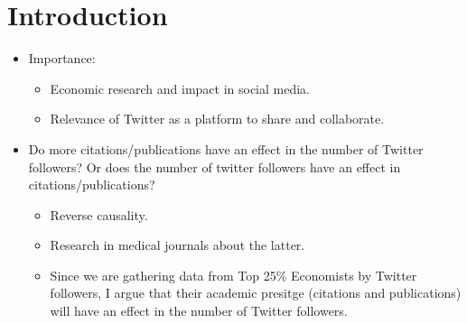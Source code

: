 \documentclass[12pt,english]{article}
\begin{document}
\section{Introduction}\label{sec:intro}
\begin{itemize}
    \item Importance:
    \begin{itemize}
        \item Economic research and impact in social media.
        \item Relevance of Twitter as a platform to share and collaborate.
    \end{itemize}
    \item Do more citations/publications have an effect in the number of Twitter followers? Or does the number of twitter followers have an effect in citations/publications?
    \begin{itemize}
        \item Reverse causality.
        \item Research in medical journals about the latter.
        \item Since we are gathering data from Top 25\% Economists by Twitter followers, I argue that their academic presitge (citations and publications) will have an effect in the number of Twitter followers. 
    \end{itemize}
\end{itemize}
\end{document}

